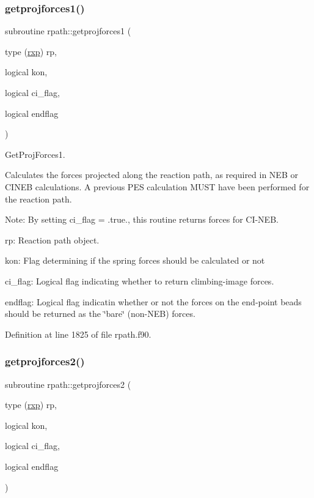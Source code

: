 \subsubsection{\texorpdfstring{getprojforces1()}{getprojforces1()}}
{\footnotesize\ttfamily subroutine rpath\+::getprojforces1 (\begin{DoxyParamCaption}\item[{type (\mbox{\hyperlink{structrpath_1_1rxp}{rxp}})}]{rp,  }\item[{logical}]{kon,  }\item[{logical}]{ci\+\_\+flag,  }\item[{logical}]{endflag }\end{DoxyParamCaption})}



Get\+Proj\+Forces1. 

Calculates the forces projected along the reaction path, as required in N\+EB or C\+I\+N\+EB calculations. A previous P\+ES calculation M\+U\+ST have been performed for the reaction path.

Note\+: By setting ci\+\_\+flag = .true., this routine returns forces for C\+I-\/\+N\+EB.


\begin{DoxyItemize}
\item rp\+: Reaction path object.
\item kon\+: Flag determining if the spring forces should be calculated or not
\item ci\+\_\+flag\+: Logical flag indicating whether to return climbing-\/image forces.
\item endflag\+: Logical flag indicatin whether or not the forces on the end-\/point beads should be returned as the \char`\"{}bare\char`\"{} (non-\/\+N\+EB) forces. 
\end{DoxyItemize}

Definition at line 1825 of file rpath.\+f90.

\mbox{\label{namespacerpath_ac95367fc9bf411eca8d31874d5e3e703}} 
\subsubsection{\texorpdfstring{getprojforces2()}{getprojforces2()}}
{\footnotesize\ttfamily subroutine rpath\+::getprojforces2 (\begin{DoxyParamCaption}\item[{type (\mbox{\hyperlink{structrpath_1_1rxp}{rxp}})}]{rp,  }\item[{logical}]{kon,  }\item[{logical}]{ci\+\_\+flag,  }\item[{logical}]{endflag }\end{DoxyParamCaption})}



